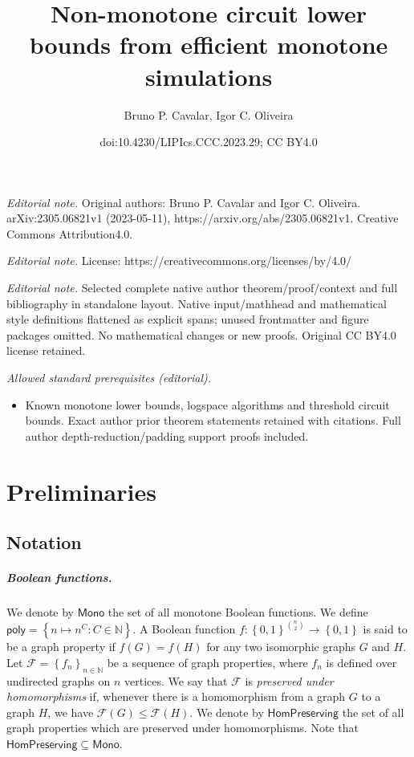 \documentclass[10pt,a4paper]{article}
\title{Non-monotone circuit lower bounds from efficient monotone simulations}
\author{Bruno P. Cavalar, Igor C. Oliveira}
\date{doi:10.4230/LIPIcs.CCC.2023.29; CC BY4.0}
\newcommand{\poly}{\mathsf{poly}}
\newcommand{\monfns}{\mathsf{Mono}}
\newcommand{\HomPres}{\mathsf{HomPreserving}}
\def\sseq{\subseteq}
\newcommand{\set}[1]{\left\{#1\right\}}
\newcommand{\blt}{\set{0,1}}
\def\bbn{{\mathbb N}}
\def\calf{{\mathcal F}}
\begin{document}
\maketitle
\setcounter{section}{2}
\noindent\textit{Editorial note.} Original authors: Bruno P. Cavalar and Igor C. Oliveira. arXiv:2305.06821v1 (2023-05-11), https://arxiv.org/abs/2305.06821v1. Creative Commons Attribution4.0.\par\medskip
\noindent\textit{Editorial note.} License: https://creativecommons.org/licenses/by/4.0/\par\medskip
\noindent\textit{Editorial note.} Selected complete native author theorem/proof/context and full bibliography in standalone layout. Native input/mathhead and mathematical style definitions flattened as explicit spans; unused frontmatter and figure packages omitted. No mathematical changes or new proofs. Original CC BY4.0 license retained.\par\medskip
\noindent\textit{Allowed standard prerequisites (editorial).}\begin{itemize}
\item Known monotone lower bounds, logspace algorithms and threshold circuit bounds. Exact author prior theorem statements retained with citations. Full author depth-reduction/padding support proofs included.
\end{itemize}\medskip
\section{Preliminaries}

\subsection{Notation}

\subparagraph{Boolean functions.}

We denote by $\monfns$ the set of all monotone Boolean functions.
We define $\poly = \set{n \mapsto n^C : C \in \bbn}$.
A Boolean function
    $f : \blt^{\binom{n}{2}} \to \blt$ is said to be a graph property
    if $f(G) = f(H)$ for any two isomorphic graphs $G$ and $H$.
Let $\calf = \set{f_n}_{n \in \bbn}$
    be a sequence of graph properties, where $f_n$ is defined over undirected graphs on
    $n$ vertices.
    We say that $\calf$ is
    \emph{preserved under homomorphisms} if,
    whenever there is a homomorphism from a graph $G$ to a graph $H$,
    we have $\calf(G) \leq \calf(H)$.
    We denote by $\HomPres$ 
    the set of all 
    graph properties which are preserved under homomorphisms.
    Note that $\HomPres \sseq \monfns$.
\end{document}
